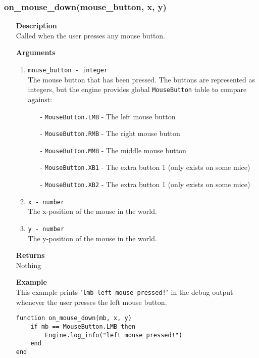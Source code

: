 \documentclass[12pt,a4paper]{article}
\begin{document}
\subsubsection{on\_mouse\_down(mouse\_button, x, y)}
\begin{itemize}
	\item[]{\bf Description}
		\\ Called when the user presses any mouse button.
	\item[]{\bf Arguments}
		\begin{enumerate}
			\item{\texttt{mouse\_button - integer}} 
				\\ The mouse button that has been pressed. The buttons are represented as integers, but the engine provides global \texttt{MouseButton} table to compare against:
				\begin{itemize}
					\item[-]\texttt{MouseButton.LMB} - The left mouse button
					\item[-]\texttt{MouseButton.RMB} - The right mouse button
					\item[-]\texttt{MouseButton.MMB} - The middle mouse button
					\item[-]\texttt{MouseButton.XB1} - The extra button 1 (only exists on some mice)
					\item[-]\texttt{MouseButton.XB2} - The extra button 1 (only exists on some mice)
				\end{itemize}
			\item{\texttt{x - number}}
				\\ The x-position of the mouse in the world.
			\item{\texttt{y - number}}
				\\ The y-position of the mouse in the world.
		\end{enumerate}
	\item[]{\bf Returns}
		\\ Nothing
	\item[]{\bf Example}
	\\ This example prints "\texttt{lmb left mouse pressed!}" in the debug output whenever the user presses the left mouse button.
\begin{lstlisting}[language={[5.0]Lua}]
function on_mouse_down(mb, x, y)
    if mb == MouseButton.LMB then
        Engine.log_info("left mouse pressed!")
    end
end
\end{lstlisting}
\end{itemize}
\end{document}
